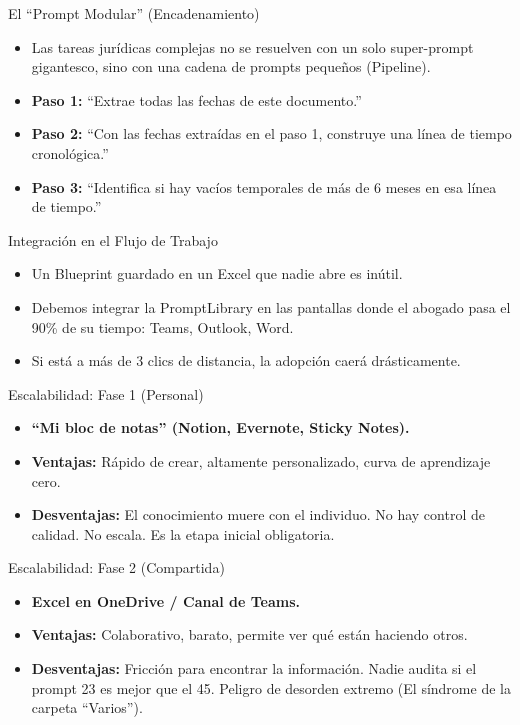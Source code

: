 \documentclass[aspectratio=169]{beamer}
\begin{document}
\begin{frame}{El ``Prompt Modular'' (Encadenamiento)}

\begin{itemize}
  \item Las tareas jurídicas complejas no se resuelven con un solo super-prompt gigantesco, sino con una cadena de prompts pequeños (Pipeline).
  \item \textbf{Paso 1:} ``Extrae todas las fechas de este documento.''
  \item \textbf{Paso 2:} ``Con las fechas extraídas en el paso 1, construye una línea de tiempo cronológica.''
  \item \textbf{Paso 3:} ``Identifica si hay vacíos temporales de más de 6 meses en esa línea de tiempo.''
\end{itemize}
\end{frame}

\begin{frame}{Integración en el Flujo de Trabajo}

\begin{itemize}
  \item Un Blueprint guardado en un Excel que nadie abre es inútil.
  \item Debemos integrar la PromptLibrary en las pantallas donde el abogado pasa el 90\% de su tiempo: Teams, Outlook, Word.
  \item Si está a más de 3 clics de distancia, la adopción caerá drásticamente.
\end{itemize}
\end{frame}

\begin{frame}{Escalabilidad: Fase 1 (Personal)}

\begin{itemize}
  \item \textbf{``Mi bloc de notas'' (Notion, Evernote, Sticky Notes).}
  \item \textbf{Ventajas:} Rápido de crear, altamente personalizado, curva de aprendizaje cero.
  \item \textbf{Desventajas:} El conocimiento muere con el individuo. No hay control de calidad. No escala. Es la etapa inicial obligatoria.
\end{itemize}
\end{frame}

\begin{frame}{Escalabilidad: Fase 2 (Compartida)}

\begin{itemize}
  \item \textbf{Excel en OneDrive / Canal de Teams.}
  \item \textbf{Ventajas:} Colaborativo, barato, permite ver qué están haciendo otros.
  \item \textbf{Desventajas:} Fricción para encontrar la información. Nadie audita si el prompt 23 es mejor que el 45. Peligro de desorden extremo (El síndrome de la carpeta ``Varios'').
\end{itemize}
\end{frame}
\end{document}
